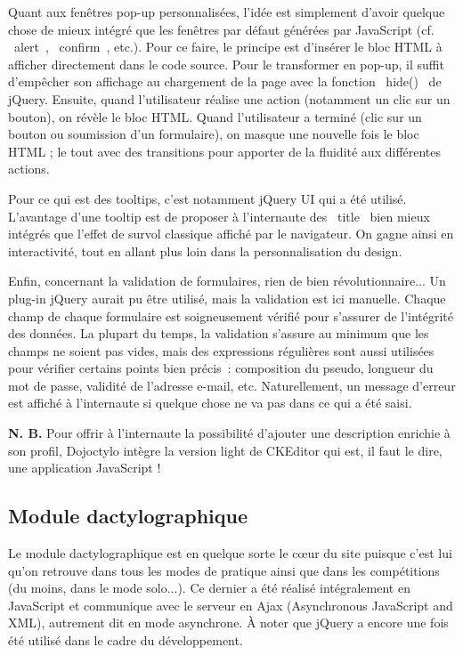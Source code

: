 \documentclass[a4paper,12pt]{article}
\begin{document}
Quant aux fenêtres pop-up personnalisées, l'idée est simplement d'avoir quelque chose de mieux intégré que les fenêtres par défaut générées par JavaScript (cf. \og~alert~\fg, \og~confirm~\fg, etc.). Pour ce faire, le principe est d'insérer le bloc HTML à afficher directement dans le code source. Pour le transformer en pop-up, il suffit d'empêcher son affichage au chargement de la page avec la fonction \og~hide()~\fg{} de jQuery. Ensuite, quand l'utilisateur réalise une action (notamment un clic sur un bouton), on révèle le bloc HTML. Quand l'utilisateur a terminé (clic sur un bouton ou soumission d'un formulaire), on masque une nouvelle fois le bloc HTML ; le tout avec des transitions pour apporter de la fluidité aux différentes actions.

Pour ce qui est des tooltips, c'est notamment jQuery UI qui a été utilisé. L'avantage d'une tooltip est de proposer à l'internaute des \og~title~\fg{} bien mieux intégrés que l'effet de survol classique affiché par le navigateur. On gagne ainsi en interactivité, tout en allant plus loin dans la personnalisation du design.

Enfin, concernant la validation de formulaires, rien de bien révolutionnaire... Un plug-in jQuery aurait pu être utilisé, mais la validation est ici manuelle. Chaque champ de chaque formulaire est soigneusement vérifié pour s'assurer de l'intégrité des données. La plupart du temps, la validation s'assure au minimum que les champs ne soient pas vides, mais des expressions régulières sont aussi utilisées pour vérifier certains points bien précis~: composition du pseudo, longueur du mot de passe, validité de l'adresse e-mail, etc. Naturellement, un message d'erreur est affiché à l'internaute si quelque chose ne va pas dans ce qui a été saisi.

\textbf{N. B.} Pour offrir à l'internaute la possibilité d'ajouter une description enrichie à son profil, Dojoctylo intègre la version light de CKEditor qui est, il faut le dire, une application JavaScript !

\subsection{Module dactylographique}

Le module dactylographique est en quelque sorte le cœur du site puisque c'est lui qu'on retrouve dans tous les modes de pratique ainsi que dans les compétitions (du moins, dans le mode solo...). Ce dernier a été réalisé intégralement en JavaScript et communique avec le serveur en Ajax (Asynchronous JavaScript and XML), autrement dit en mode asynchrone. À noter que jQuery a encore une fois été utilisé dans le cadre du développement.
\end{document}
